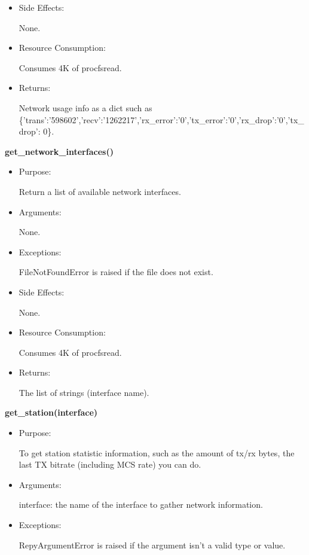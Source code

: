 {\begin{itemize}
\item Side Effects:

None.

\item Resource Consumption:

Consumes 4K of procfsread.

\item Returns:

Network usage info as a dict such as \{'trans':'598602','recv':'1262217','rx\_error':'0','tx\_error':'0','rx\_drop':'0','tx\_drop': 0\}.
\end{itemize}

\textbf{get\_network\_interfaces()}
\begin{itemize}
\item Purpose:

Return a list of available network interfaces.

\item Arguments:

None.

\item Exceptions:

FileNotFoundError is raised if the file does not exist.

\item Side Effects:

None.

\item Resource Consumption:

Consumes 4K of procfsread.

\item Returns:

The list of strings (interface name).

\end{itemize}

\textbf{get\_station(interface)}
\begin{itemize}
\item Purpose:

To get station statistic information, such as the amount of tx/rx bytes, the last TX bitrate (including MCS rate) you can do.

\item Arguments:

interface: the name of the interface to gather network information.

\item Exceptions:

RepyArgumentError is raised if the argument isn't a valid type or value.


\end{itemize}}
